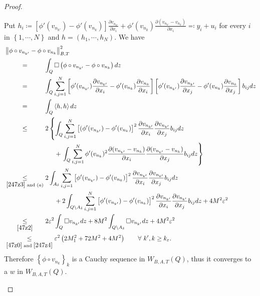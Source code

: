 \documentclass[11pt, a4paper]{article}
\numberwithin{equation}{section}
\newcommand{\coex}[2][\hphantom{longexplanation}]{%
  \underset{{#1}}{\overset{\hphantom{longexplanation}}{#2}}
}
\newcommand{\vuong}{\square}
\newcommand{\abs}[1]{\left\lvert #1\right\rvert}
\newcommand{\norm}[1]{\left\lVert #1\right\rVert}
\begin{document}
\begin{proof}
\begin{description}[wide]
Put  $\displaystyle h_{i}\coloneqq
\left[\phi'(v_{n_{k'}})-\phi'(v_{n_{k}}) \right]\frac{\partial
  v_{n_{k'}}}{\partial x_{i}} + \phi'(v_{n_{k}})\frac{\partial
  (v_{n_{k'}}-v_{n_{k}})}{\partial x_{i}} \eqqcolon y_i + u_i$ for every $i$ in $\left\{1,\cdots,N\right\}$ and $h=(h_{1},\cdots,h_{N})$. We have    
\begin{align}
  \label{b1}
  \begin{split}
    &\norm{\phi\circ v_{n_{k'}} - \phi\circ v_{n_{k}}}_{B,T} ^{2}\\
    &\coex{=} \int_{Q}\vuong \left(\phi\circ v_{n_{k'}} - \phi\circ
      v_{n_{k}} \right)dz\\
    &\coex{=} \int_{Q} \sum_{i,j=1}^{N} \left[\phi'(v_{n_{k'}})\frac{\partial  v_{n_{k'}}
      }{\partial x_{i}} - \phi'(v_{n_{k}})\frac{\partial
      v_{n_{k}}}{\partial x_{i}} \right] \left[\phi'(v_{n_{k'}})\frac{\partial
      v_{n_{k'}} }{\partial x_{j}} - \phi'(v_{n_{k}})\frac{\partial
      v_{n_{k}}}{\partial x_{j}} \right]b_{ij} dz\\
    &\coex{=}\int_{Q} \left\langle h,h \right\rangle dz\\
    &\coex{\le}
      2\left\{\int_{Q}\sum_{i,j=1}^{N}\left[(\phi'(v_{n_{k'}})-\phi'(v_{n_{k}})\right]^{2}\frac{\partial
      v_{n_{k'}} }{\partial x_{i}}\frac{\partial  v_{n_{k'}}
      }{\partial x_{j}}b_{ij} dz \right.\\
    &\coex{~} \qquad + \left.\int_{Q} \sum_{i,j=1}^{N}\phi'(v_{n_{k}})^{2}\frac{\partial
      (v_{n_{k'}}-v_{n_{k}}) }{\partial x_{i}} \frac{\partial
      (v_{n_{k'}}-v_{n_{k}}) }{\partial x_{j}}b_{ij} dz\right\}\\
    &\coex[\eqref{247z3} \text{ and } (a)]{\le} %
 2\int_{A_{\delta}}\sum_{i,j=1}^{N}\left[\phi'(v_{n_{k'}})-\phi'(v_{n_{k}})\right]^{2}\frac{\partial
      v_{n_{k'}} }{\partial x_{i}}\frac{\partial  v_{n_{k'}}
      }{\partial x_{j}}b_{ij} dz\\
    &\coex{~} \qquad
      +2\int_{Q\setminus A_{\delta}} \sum_{i,j=1}^{N}\left[\phi'(v_{n_{k'}})-\phi'(v_{n_{k}}) \right]^{2}\frac{\partial  v_{n_{k'}}
      }{\partial x_{i}}\frac{\partial  v_{n_{k'}} }{\partial
      x_{j}}b_{ij} dz+ 4M^{2}\varepsilon^{2}\\
    &\coex[\eqref{47z2}]{\le} 2\varepsilon^{2}\int_{Q}\vuong
      v_{n_{k'}}dz+8M^{2}\int_{Q\setminus A_{\delta}}\vuong
      v_{n_{k'}} dz + 4M^{2}\varepsilon^{2}\\
    &\coex[\eqref{47z0} \text{ and }\eqref{247z4}]{\le}
      \varepsilon^{2}\left(2 M_{1}^{2}+ 72 M^{2}+ 4 M^{2}\right)\qquad\forall~k',k\ge k_{\varepsilon}.
  \end{split}
\end{align}   
 Therefore $\left\{\phi \circ v_{n_{k}}\right\}_{k}$ is a Cauchy
 sequence in $W_{B,A,T}(Q)$, thus it converges to a $w$ in  $W_{B,A,T}(Q)$.


\end{description}
\end{proof}
\end{document}
